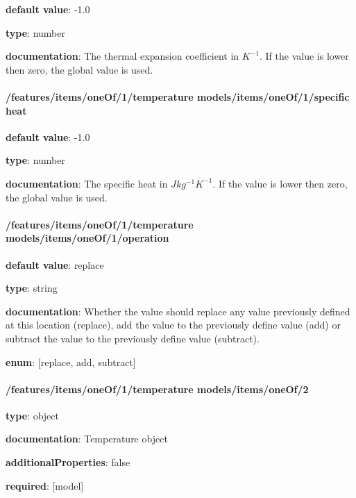 \begin{itemized}
\item {\bf default value}: -1.0
\item {\bf type}: number
\item {\bf documentation}: The thermal expansion coefficient in $K^{-1}$. If the value is lower then zero, the global value is used.
\end{itemized}\paragraph{/features/items/oneOf/1/temperature models/items/oneOf/1/specific heat} \begin{itemized}
\item {\bf default value}: -1.0
\item {\bf type}: number
\item {\bf documentation}: The specific heat in $J kg^{-1} K^{-1}$. If the value is lower then zero, the global value is used.
\end{itemized}\paragraph{/features/items/oneOf/1/temperature models/items/oneOf/1/operation} \begin{itemized}
\item {\bf default value}: replace
\item {\bf type}: string
\item {\bf documentation}: Whether the value should replace any value previously defined at this location (replace), add the value to the previously define value (add) or subtract the value to the previously define value (subtract).
\item {\bf enum}: [replace, add, subtract]\end{itemized}\paragraph{/features/items/oneOf/1/temperature models/items/oneOf/2} \begin{itemized}
\item {\bf type}: object
\item {\bf documentation}: Temperature object
\item {\bf additionalProperties}: false
\item {\bf required}: [model]\end{itemized}
